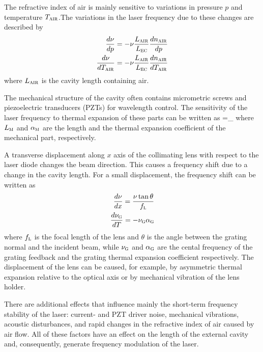 The refractive index of air is mainly sensitive to variations in pressure $p$ and temperature $T_{\mbox{\footnotesize{\scshape{air}}}}$.The variations in the laser frequency due to these changes are described by
\begin{align}
\frac{d\nu}{dp}=-\nu\frac{L_{\mbox{\footnotesize{\scshape{air}}}}}{L_{\mbox{\footnotesize{\scshape{ec}}}}}\frac{dn_{\mbox{\footnotesize{\scshape{air}}}}}{dp}\label{effect2}\\
\frac{d\nu}{dT_{\mbox{\footnotesize{\scshape{air}}}}}=-\nu\frac{L_{\mbox{\footnotesize{\scshape{air}}}}}{L_{\mbox{\footnotesize{\scshape{ec}}}}}\frac{dn_{\mbox{\footnotesize{\scshape{air}}}}}{dT_{\mbox{\footnotesize{\scshape{air}}}}}
\label{effect3}
\end{align}
where $L_{\mbox{\footnotesize{\scshape{air}}}}$ is the cavity length containing air.	

The mechanical structure of the cavity often contains micrometric screws and piezoelectric transducers (PZTs) for wavelength control. The sensitivity of the laser frequency to thermal expansion of these parts can be written as
\mate
{}=\pm\nu{}\alpha_{}
\label{effect4}
\atem
where $L_{\mbox{\footnotesize{\scshape{m}}}}$ and $\alpha_{\mbox{\footnotesize{\scshape{m}}}}$ are the length and the thermal expansion coefficient of the mechanical part, respectively.

A transverse displacement along $x$ axis of the collimating lens with respect to the laser diode changes the beam direction. This causes a frequency shift due to a change in the cavity length. For a small displacement, the frequency shift can be written as
\begin{align}
\frac{d\nu}{dx}=\frac{\nu\tan\theta}{f_{\mbox{\footnotesize{\scshape{l}}}}}
\label{displacement}\\
\frac{d\nu_{\mbox{\footnotesize{\scshape{g}}}}}{dT}=-\nu_{\mbox{\footnotesize{\scshape{g}}}}\alpha_{\mbox{\footnotesize{\scshape{g}}}}
\label{displacement2}
\end{align}
where $f_{\mbox{\footnotesize{\scshape{l}}}}$ is the focal length of the lens and $\theta$ is the angle between the grating normal and the incident beam, while $\nu_{\mbox{\footnotesize{\scshape{g}}}}$ and $\alpha_{\mbox{\footnotesize{\scshape{g}}}}$ are the cental frequency of the grating feedback and the grating thermal expansion coefficient respectively. The displacement of the lens can be caused, for example, by asymmetric thermal expansion relative to the optical axis or by mechanical vibration of the lens holder. 

There are additional effects that influence mainly the short-term frequency stability of the laser: current- and PZT driver noise, mechanical vibrations, acoustic disturbances, and rapid changes in the refractive index of air caused by air flow. All of these factors have an effect on the length of the external cavity and, consequently, generate frequency modulation of the laser.
